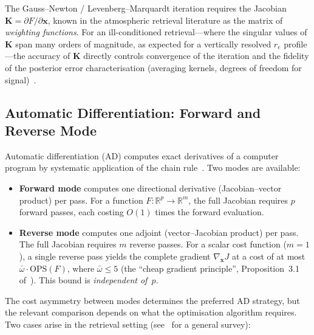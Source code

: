 \documentclass[11pt,a4paper]{article}
\newcommand{\R}{\mathbb{R}}
\newcommand{\vect}[1]{\bm{#1}}
\newcommand{\mat}[1]{\mathbf{#1}}
\theoremstyle{definition}
\begin{document}
The Gauss--Newton / Levenberg--Marquardt iteration requires the
Jacobian $\mat{K} = \partial F / \partial \vect{x}$, known in the
atmospheric retrieval literature as the matrix of
\emph{weighting functions}.  For an ill-conditioned retrieval---where the
singular values of $\mat{K}$ span many orders of magnitude, as expected
for a vertically resolved $r_e$ profile---the accuracy of $\mat{K}$
directly controls convergence of the iteration and the fidelity of the
posterior error characterisation (averaging kernels, degrees of freedom
for signal)~\cite{rodgers2000}.

\subsection{Automatic Differentiation: Forward and Reverse Mode}
\label{sec:ad}

Automatic differentiation (AD) computes exact derivatives of a
computer program by systematic application of the chain
rule~\cite{griewank2008}.  Two modes are available:

\begin{itemize}[nosep]
  \item \textbf{Forward mode} computes one directional derivative
    (Jacobian--vector product) per pass.  For a function
    $F : \R^p \to \R^m$, the full Jacobian requires $p$ forward passes,
    each costing $O(1)$ times the forward evaluation.
  \item \textbf{Reverse mode} computes one adjoint (vector--Jacobian
    product) per pass.  The full Jacobian requires $m$ reverse passes.
    For a scalar cost function ($m = 1$), a single reverse pass yields
    the complete gradient $\nabla_{\!\vect{x}} J$ at a cost of at most
    $\bar{\omega} \cdot \mathrm{OPS}(F)$, where $\bar{\omega} \leq 5$
    (the ``cheap gradient principle'', Proposition~3.1
    of~\cite{griewank2008}).  This bound is \emph{independent of~$p$}.
\end{itemize}

The cost asymmetry between modes determines the preferred AD strategy,
but the relevant comparison depends on what the optimisation algorithm
requires.  Two cases arise in the retrieval setting
(see~\cite{baydin2018} for a general survey):
\end{document}
